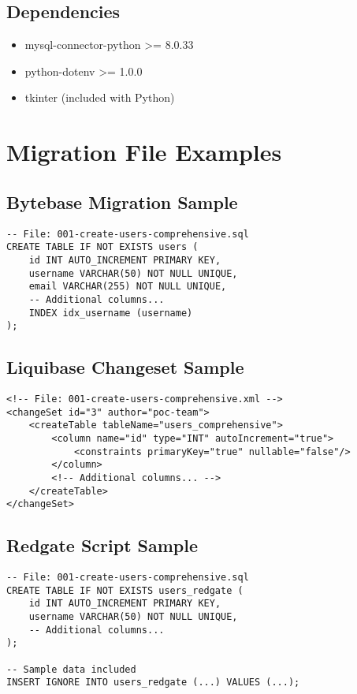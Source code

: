 \documentclass[11pt,a4paper]{article}
\begin{document}
\subsection{Dependencies}
\begin{itemize}
\item mysql-connector-python >= 8.0.33
\item python-dotenv >= 1.0.0
\item tkinter (included with Python)
\end{itemize}

\section{Migration File Examples}

\subsection{Bytebase Migration Sample}
\begin{verbatim}
-- File: 001-create-users-comprehensive.sql
CREATE TABLE IF NOT EXISTS users (
    id INT AUTO_INCREMENT PRIMARY KEY,
    username VARCHAR(50) NOT NULL UNIQUE,
    email VARCHAR(255) NOT NULL UNIQUE,
    -- Additional columns...
    INDEX idx_username (username)
);
\end{verbatim}

\subsection{Liquibase Changeset Sample}
\begin{verbatim}
<!-- File: 001-create-users-comprehensive.xml -->
<changeSet id="3" author="poc-team">
    <createTable tableName="users_comprehensive">
        <column name="id" type="INT" autoIncrement="true">
            <constraints primaryKey="true" nullable="false"/>
        </column>
        <!-- Additional columns... -->
    </createTable>
</changeSet>
\end{verbatim}

\subsection{Redgate Script Sample}
\begin{verbatim}
-- File: 001-create-users-comprehensive.sql
CREATE TABLE IF NOT EXISTS users_redgate (
    id INT AUTO_INCREMENT PRIMARY KEY,
    username VARCHAR(50) NOT NULL UNIQUE,
    -- Additional columns...
);

-- Sample data included
INSERT IGNORE INTO users_redgate (...) VALUES (...);
\end{verbatim}
\end{document}
